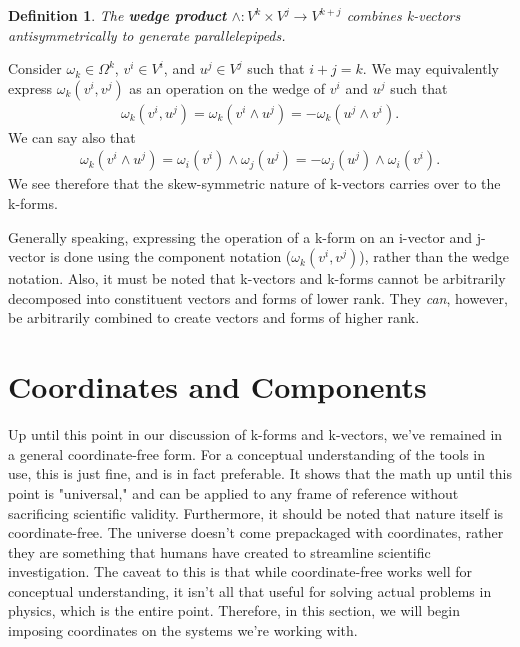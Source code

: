 \documentclass{book}
\newtheorem{defn}[equation]{Definition}
\begin{document}
\begin{defn}
	
	The \textbf{wedge product} $\wedge : V^k\times V^j \to V^{k+j}$ combines k-vectors antisymmetrically to generate parallelepipeds. 
\end{defn}






Consider $\omega_k \in \Omega^k$, $v^i \in V^i$, and $u^j \in V^j$ such that $i + j = k$. We may equivalently express $\omega_k(v^i, v^j)$ as an operation on the wedge of $v^i$ and $u^j$ such that \begin{gather}\omega_k(v^i, u^j) = \omega_k(v^i \wedge u^j) = -\omega_k(u^j \wedge v^i).\end{gather} We can say also that \begin{gather}\omega_k(v^i \wedge u^j) = \omega_i(v^i)\wedge \omega_j(u^j) = -\omega_j(u^j) \wedge \omega_i(v^i).\end{gather} We see therefore that the skew-symmetric nature of k-vectors carries over to the k-forms. 

Generally speaking, expressing the operation of a k-form on an i-vector and j-vector is done using the component notation ($\omega_k(v^i, v^j)$), rather than the wedge notation. Also, it must be noted that k-vectors and k-forms cannot be arbitrarily decomposed into constituent vectors and forms of lower rank. They \emph{can}, however, be arbitrarily combined to create vectors and forms of higher rank. 









\section{Coordinates and Components} 





Up until this point in our discussion of k-forms and k-vectors, we've remained in a general coordinate-free form. For a conceptual understanding of the tools in use, this is just fine, and is in fact preferable. It shows that the math up until this point is "universal," and can be applied to any frame of reference without sacrificing scientific validity. Furthermore, it should be noted that nature itself is coordinate-free. The universe doesn't come prepackaged with coordinates, rather they are something that humans have created to streamline scientific investigation. The caveat to this is that while coordinate-free works well for conceptual understanding, it isn't all that useful for solving actual problems in physics, which is the entire point. Therefore, in this section, we will begin imposing coordinates on the systems we're working with. 
\end{document}
